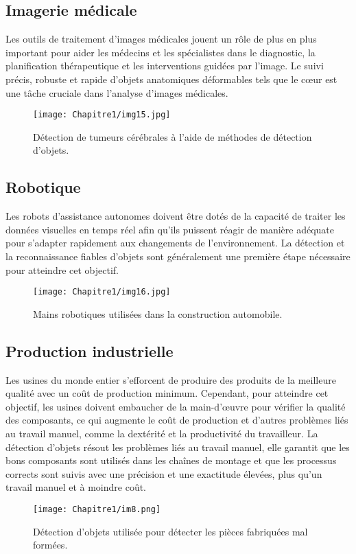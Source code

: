      \subsection{Imagerie médicale}
     Les outils de traitement d'images médicales jouent un rôle de plus en plus important pour aider les médecins et les spécialistes dans le diagnostic, la planification thérapeutique et les interventions guidées par l'image. Le suivi précis, robuste et rapide d'objets anatomiques déformables tels que le cœur est une tâche cruciale dans l'analyse d'images médicales.
     \begin{figure}[H]
          \centering
          \texttt{[image: Chapitre1/img15.jpg]}
          \caption{Détection de tumeurs cérébrales à l'aide de méthodes de détection d'objets.}
          \label{img15}
          \end{figure}

     \subsection{Robotique}
     Les robots d'assistance autonomes doivent être dotés de la capacité de traiter les données visuelles en temps réel afin qu'ils puissent réagir de manière adéquate pour s'adapter rapidement aux changements de l'environnement. La détection et la reconnaissance fiables d'objets sont généralement une première étape nécessaire pour atteindre cet objectif.
     \begin{figure}[H]
          \centering
          \texttt{[image: Chapitre1/img16.jpg]}
          \caption{Mains robotiques utilisées dans la construction automobile.}
          \label{img16}
          \end{figure}
     
     \subsection{Production industrielle}
     Les usines du monde entier s'efforcent de produire des produits de la meilleure qualité avec un coût de production minimum. Cependant, pour  atteindre cet objectif, les usines doivent embaucher de la main-d'œuvre pour vérifier la qualité des composants, ce qui augmente le coût de production et d'autres problèmes liés au travail manuel, comme la dextérité et la productivité du travailleur. La détection d'objets résout les problèmes liés au travail manuel, elle garantit que les bons composants sont utilisés dans les chaînes de montage et que les processus corrects sont suivis avec une précision et une exactitude élevées, plus qu'un travail manuel et à moindre coût.
     \begin{figure}[H]
          \centering
          \texttt{[image: Chapitre1/im8.png]}
          \caption{Détection d'objets utilisée pour détecter les pièces fabriquées mal formées.}
          \label{im8}
          \end{figure}
     
